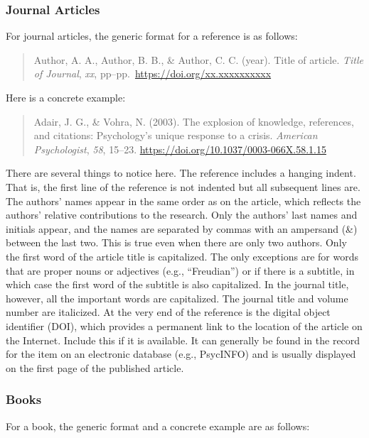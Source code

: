 \documentclass[
]{krantz}
\begin{document}
\subsubsection*{Journal Articles}\label{journal-articles}


For journal articles, the generic format for a reference is as follows:

\begin{quote}
Author, A. A., Author, B. B., \& Author, C. C. (year). Title of article. \emph{Title of Journal}, \emph{xx}, pp--pp.~\url{https://doi.org/xx.xxxxxxxxxx}
\end{quote}

Here is a concrete example:

\begin{quote}
Adair, J. G., \& Vohra, N. (2003). The explosion of knowledge, references, and citations: Psychology's unique response to a crisis. \emph{American Psychologist}, \emph{58}, 15--23. \url{https://doi.org/10.1037/0003-066X.58.1.15}
\end{quote}

There are several things to notice here. The reference includes a hanging indent. That is, the first line of the reference is not indented but all subsequent lines are. The authors' names appear in the same order as on the article, which reflects the authors' relative contributions to the research. Only the authors' last names and initials appear, and the names are separated by commas with an ampersand (\&) between the last two. This is true even when there are only two authors. Only the first word of the article title is capitalized. The only exceptions are for words that are proper nouns or adjectives (e.g., ``Freudian'') or if there is a subtitle, in which case the first word of the subtitle is also capitalized. In the journal title, however, all the important words are capitalized. The journal title and volume number are italicized. At the very end of the reference is the digital object identifier (DOI), which provides a permanent link to the location of the article on the Internet. Include this if it is available. It can generally be found in the record for the item on an electronic database (e.g., PsycINFO) and is usually displayed on the first page of the published article.

\subsubsection*{Books}\label{books}


For a book, the generic format and a concrete example are as follows:
\end{document}
